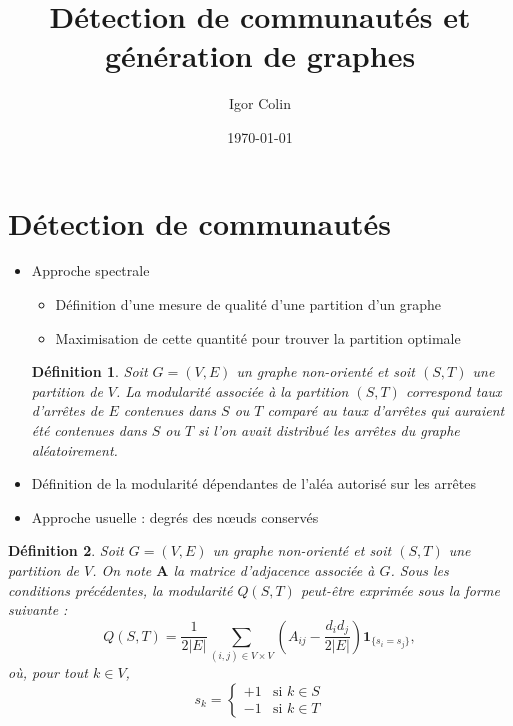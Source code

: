 \documentclass{beamer}
\title{Détection de communautés et génération de graphes}
\author{Igor Colin}
\date{\today}
\newtheorem*{deffr}{Définition}
\begin{document}
\maketitle

\section{Détection de communautés}
\begin{frame}

    \begin{itemize}
        \item Approche spectrale
        \begin{itemize}
            \item Définition d'une mesure de qualité d'une partition d'un
            graphe
            \item Maximisation de cette quantité pour trouver la partition
            optimale
        \end{itemize}

        \begin{deffr}
            Soit $G = (V, E)$ un graphe non-orienté et soit $(S, T)$ une
            partition de $V$. La modularité associée à la partition $(S, T)$
            correspond taux d'arrêtes de $E$ contenues dans $S$ ou $T$ comparé
            au taux d'arrêtes qui auraient été contenues dans $S$ ou $T$ si
            l'on avait distribué les arrêtes du graphe aléatoirement.
        \end{deffr}

        \item Définition de la modularité dépendantes de l'aléa autorisé sur
        les arrêtes
        \item Approche usuelle : degrés des n\oe{}uds conservés
    \end{itemize}

\end{frame}

\begin{frame}

    \begin{deffr}
        Soit $G = (V, E)$ un graphe non-orienté et soit $(S, T)$ une partition
        de $V$. On note $\mathbf{A}$ la matrice d'adjacence associée à $G$.
        Sous les conditions précédentes, la modularité $Q(S, T)$ peut-être
        exprimée sous la forme suivante :
        \[
            Q(S, T) = \frac{1}{2|E|} \sum_{(i, j) \in V \times V}
                \left( A_{ij} - \frac{d_i d_j}{2|E|} \right)
                \mathbf{1}_{\{s_i = s_j\}},
        \]
        où, pour tout $k \in V$,
        \[
            s_k = \left\{
                \begin{array}{ll}
                    +1 & \text{si $k \in S$} \\
                    -1 & \text{si $k \in T$}
                \end{array}
            \right.
        \]
    \end{deffr}

\end{frame}
\end{document}
